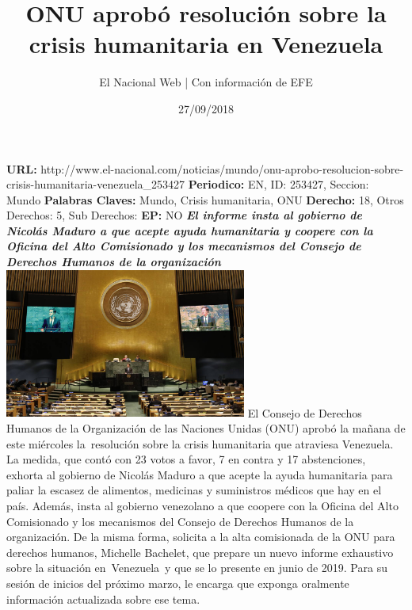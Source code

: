 \documentclass{article}%
\title{\textbf{ONU aprobó resolución sobre la crisis humanitaria en Venezuela}}%
\author{El Nacional Web | Con información de EFE}%
\date{27/09/2018}%
\begin{document}
%
\normalsize%
\maketitle%
\textbf{URL: }%
http://www.el{-}nacional.com/noticias/mundo/onu{-}aprobo{-}resolucion{-}sobre{-}crisis{-}humanitaria{-}venezuela\_253427\newline%
%
\textbf{Periodico: }%
EN, %
ID: %
253427, %
Seccion: %
Mundo\newline%
%
\textbf{Palabras Claves: }%
Mundo, Crisis humanitaria, ONU\newline%
%
\textbf{Derecho: }%
18, %
Otros Derechos: %
5, %
Sub Derechos: %
\newline%
%
\textbf{EP: }%
NO\newline%
\newline%
%
\textbf{\textit{El informe insta al gobierno de Nicolás Maduro a que acepte ayuda humanitaria y coopere con la Oficina del Alto Comisionado y los mecanismos del Consejo de Derechos Humanos de la organización~}}%
\newline%
\newline%
%
\includegraphics[width=300px]{233.jpg}%
\newline%
%
El Consejo de Derechos Humanos de la Organización de las Naciones Unidas (ONU) aprobó la mañana de este miércoles la~resolución sobre la crisis humanitaria que atraviesa Venezuela.%
\newline%
%
La medida, que contó con 23 votos a favor, 7 en contra y 17 abstenciones, exhorta al gobierno de Nicolás Maduro a que acepte la ayuda humanitaria para paliar la escasez de alimentos, medicinas y suministros médicos que hay en el país.%
\newline%
%
Además, insta al gobierno venezolano a que coopere con la Oficina del Alto Comisionado y los mecanismos del Consejo de Derechos Humanos de la organización.%
\newline%
%
De la misma forma, solicita a la alta comisionada de la ONU para derechos humanos, Michelle Bachelet, que prepare un nuevo informe exhaustivo sobre la situación en~Venezuela~y que se lo presente en junio de 2019. Para su sesión de inicios del próximo marzo, le encarga que exponga oralmente información actualizada sobre ese tema.%
\end{document}
